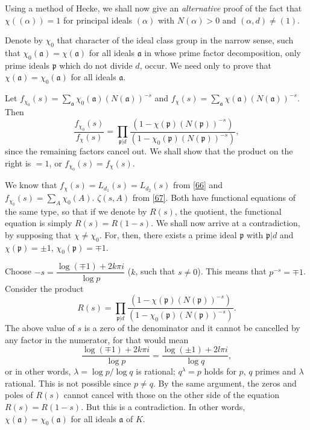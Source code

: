 Using a method of Hecke, we shall now give an {\em alternative} proof
of the fact that $\chi((\alpha))=1$ for principal ideals $(\alpha)$
with $N(\alpha)>0$ and $(\alpha,d)\neq (1)$.

Denote by $\chi_{0}$ that character of the ideal class group in the
narrow sense, such that $\chi_{0}(\mathfrak{a})=\chi(\mathfrak{a})$
for all ideals $\mathfrak{a}$ in whose prime factor decomposition,
only prime ideals $\mathfrak{p}$ which do not divide $d$, occur. We
need only to prove that $\chi(\mathfrak{a})=\chi_{0}(\mathfrak{a})$
for all ideals $\mathfrak{a}$.

Let
$f_{\chi_{0}}(s)=\sum\limits_{\mathfrak{a}}\chi_{0}(\mathfrak{a})(N(\mathfrak{a}))^{-s}$
and
$f_{\chi}(s)=\sum\limits_{\mathfrak{a}}\chi(\mathfrak{a})(N(\mathfrak{a}))^{-s}$. Then
$$
\frac{f_{\chi_{0}}(s)}{f_{\chi}(s)}=\prod_{\mathfrak{p}|d}\frac{(1-\chi(\mathfrak{p})(N(\mathfrak{p}))^{-s})}{(1-\chi_{0}(\mathfrak{p})(N(\mathfrak{p}))^{-s})}, 
$$
since the remaining factors cancel out. We shall show that the product
on the right is $=1$, or $f_{\chi_{0}}(s)=f_{\chi}(s)$.

We know that $f_{\chi}(s)=L_{d_{1}}(s)=L_{d_{2}}(s)$ from \eqref{66}
and $f_{\chi_{0}}(s)=\sum\limits_{A}\chi_{0}(A)$. $\zeta(s,A)$ from
\eqref{67}. Both have functional equations of the same type, so that
if we denote by $R(s)$, the quotient, the functional equation is
simply $R(s)=R(1-s)$. We shall now arrive at a contradiction, by
supposing that $\chi\neq \chi_{0}$. For, then, there exists a prime
ideal $\mathfrak{p}$ with $\mathfrak{p}|d$ and $\chi(\mathfrak{p})=\pm
1$, $\chi_{0}(\mathfrak{p})=\mp 1$.

Choose $-s=\dfrac{\log(\mp 1)+2k\pi i}{\log p}$ ($k$, such that $s\neq
0$). This means that $p^{-s}=\mp 1$. Consider the product
$$
R(s)=\prod_{\mathfrak{p}|d}\frac{(1-\chi(\mathfrak{p})(N(\mathfrak{p}))^{-s})}{(1-\chi_{0}(\mathfrak{p})(N(\mathfrak{p}))^{-s})}. 
$$
The above value of $s$ is a zero of the denominator and it cannot be
cancelled by any factor in the numerator, for that would mean 
$$
\frac{\log (\mp 1)+2k\pi i}{\log p}=\frac{\log(\pm 1)+2l\pi i}{\log
  q},
$$\pageoriginale
or in other words, $\lambda=\log p/\log q$ is rational; \ie
$q^{\lambda}=p$ holds for $p$, $q$ primes and $\lambda$ rational. This
is not possible since $p\neq q$. By the same argument, the zeros and
poles of $R(s)$ cannot cancel with those on the other side of the
equation $R(s)=R(1-s)$. But this is a contradiction. In other words,
$\chi(\mathfrak{a})=\chi_{0}(\mathfrak{a})$ for all ideals
$\mathfrak{a}$ of $K$.

